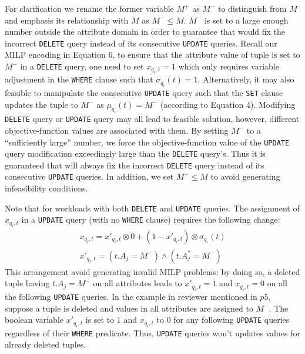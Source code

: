 
For clarification we rename the former variable $M^+$ as $M^-$ to distinguish
from $M$ and emphasis its relationship with $M$ as $M^- \leq M$. $M^-$ is set
to a large enough number outside the attribute domain in order to guarantee
that \sys would fix the incorrect \texttt{DELETE} query instead of its
consecutive \texttt{UPDATE} queries. Recall our MILP encoding in Equation 6,
to ensure that the attribute value of tuple is set to $M^-$ in a
\texttt{DELETE} query, one need to set $x_{q_i,t} = 1$ which only requires
variable adjustment in the \texttt{WHERE} clause such that $\sigma_{q_i}(t) =
1$. Alternatively, it may also feasible to manipulate the consecutive
\texttt{UPDATE} query such that the \texttt{SET} clause updates the tuple to
$M^-$ as $\mu_{q_i}(t) = M^-$ (according to Equation 4). Modifying
\texttt{DELETE} query or \texttt{UPDATE} query may all lead to feasible
solution, however, different objective-function values are associated with
them. By setting $M^-$ to a ``sufficiently large'' number, we force the
objective-function value of the \texttt{UPDATE} query modification exceedingly
large than the \texttt{DELETE} query's. Thus it is guaranteed that \sys will
always fix the incorrect \texttt{DELETE} query instead of its consecutive
\texttt{UPDATE} queries. In addition, we set $M^- \leq M$ to avoid generating
infeasibility conditions.

Note that for workloads with both \texttt{DELETE} and \texttt{UPDATE} queries.
The assignment of $x_{q_i, t}$ in a \texttt{UPDATE} query 
(with no \texttt{WHERE} clause) requires the following change:
\begin{align}
\label{eq:x2}
x_{q_i, t} = x'_{q_i, t} \otimes 0 + (1-x'_{q_i, t}) \otimes \sigma_{q_i}(t) \nonumber \\
x'_{q_i, t}= (t.A_j = M^-) \wedge (t.A_j^* = M^-) 
\end{align}
This arrangement avoid generating invalid MILP problems:
by doing so, a deleted tuple having $t.A_j = M^-$ on all attributes leads to 
$x'_{q_i, t} = 1$ and $x_{q_i, t}  = 0$ on all the following \texttt{UPDATE} queries. 
In the example in reviewer mentioned in $p5$, suppose a tuple is deleted and values in all attributes are assigned to $M^-$. 
The boolean variable $x'_{q_i, t}$ is set to $1$ and $x_{q_i, t} $ to $0$ for any following \texttt{UPDATE} queries regardless
of their \texttt{WHERE} predicate. Thus, \texttt{UPDATE} queries won't updates values for already deleted tuples. 

